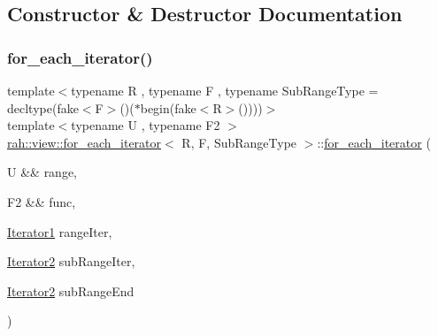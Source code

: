 \subsection{Constructor \& Destructor Documentation}
\mbox{\label{structrah_1_1view_1_1for__each__iterator_a99d35e874f60eb4765142153ade5f261}} 
\subsubsection{\texorpdfstring{for\_each\_iterator()}{for\_each\_iterator()}\hspace{0.1cm}{\footnotesize\ttfamily [1/2]}}
{\footnotesize\ttfamily template$<$typename R , typename F , typename Sub\+Range\+Type  = decltype(fake$<$\+F$>$()($\ast$begin(fake$<$\+R$>$())))$>$ \\
template$<$typename U , typename F2 $>$ \\
\mbox{\hyperlink{structrah_1_1view_1_1for__each__iterator}{rah\+::view\+::for\+\_\+each\+\_\+iterator}}$<$ R, F, Sub\+Range\+Type $>$\+::\mbox{\hyperlink{structrah_1_1view_1_1for__each__iterator}{for\+\_\+each\+\_\+iterator}} (\begin{DoxyParamCaption}\item[{U \&\&}]{range,  }\item[{F2 \&\&}]{func,  }\item[{\mbox{\hyperlink{structrah_1_1view_1_1for__each__iterator_a173ab775f95bdff3b3756714690be546}{Iterator1}}}]{range\+Iter,  }\item[{\mbox{\hyperlink{structrah_1_1view_1_1for__each__iterator_a13108a8db132a8157375f81cf9b12ce1}{Iterator2}}}]{sub\+Range\+Iter,  }\item[{\mbox{\hyperlink{structrah_1_1view_1_1for__each__iterator_a13108a8db132a8157375f81cf9b12ce1}{Iterator2}}}]{sub\+Range\+End }\end{DoxyParamCaption})\hspace{0.3cm}{\ttfamily [inline]}}

\mbox{\label{structrah_1_1view_1_1for__each__iterator_ada9b50f658aad410159d9147b1962595}} 
